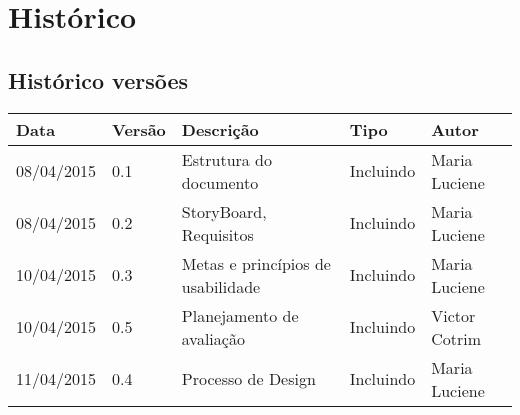 \chapter[Histórico]{Histórico}

\section{Histórico versões}

\begin{table}[h]
	\centering
	\begin{tabular}{|l|l|l|l|l|}
		\hline
		Data & Versão & Descrição & Tipo & Autor \\ \hline
		08/04/2015 & 0.1 & Estrutura do documento & Incluindo & Maria Luciene \\ \hline
		08/04/2015 & 0.2 & StoryBoard, Requisitos & Incluindo & Maria Luciene \\ \hline
		10/04/2015 & 0.3 & Metas e princípios de usabilidade & Incluindo & Maria Luciene \\ \hline
		10/04/2015 & 0.5 & Planejamento de avaliação & Incluindo & Victor Cotrim \\ \hline
		11/04/2015 & 0.4 & Processo de Design & Incluindo & Maria Luciene \\ \hline	
	\end{tabular}
\end{table}